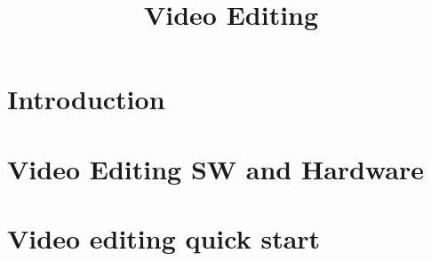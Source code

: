 \documentclass{book}
\begin{document}
\title{Video Editing }
\maketitle

\tableofcontents

\chapter{Introduction}


\chapter{Video Editing SW and Hardware}

\chapter{Video editing quick start}

\end{document}
